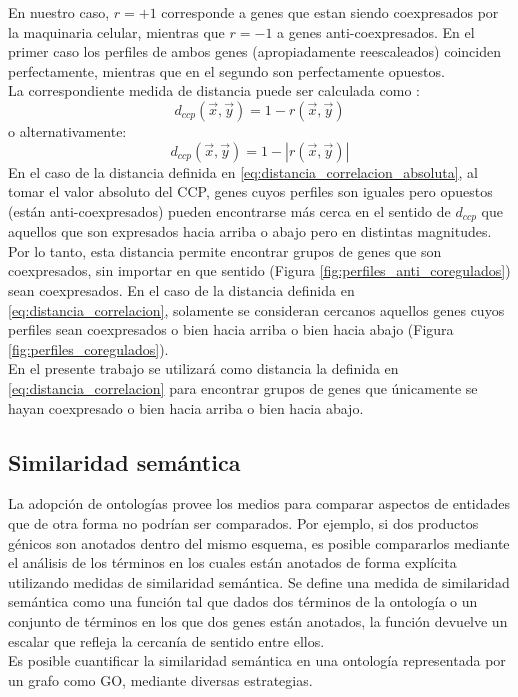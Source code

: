 En nuestro caso, $r=+1$ corresponde a genes que estan siendo coexpresados por la maquinaria celular, mientras que $r=-1$ a genes anti-coexpresados. En el primer caso los perfiles de ambos genes
(apropiadamente reescaleados) coinciden perfectamente, mientras que en el segundo son perfectamente opuestos.\\
La correspondiente medida de distancia puede ser calculada como \cite{Dhaeseleer2005}:
\begin{equation}
	d_{ccp}(\vec{x}, \vec{y}) = 1-r(\vec{x}, \vec{y})
	\label{eq:distancia_correlacion}
\end{equation}
o alternativamente:
\begin{equation}
	d_{ccp}(\vec{x}, \vec{y}) = 1-|r(\vec{x}, \vec{y})|
	\label{eq:distancia_correlacion_absoluta}
\end{equation}
En el caso de la distancia definida en \ref{eq:distancia_correlacion_absoluta}, al tomar el valor absoluto del CCP, genes cuyos perfiles son iguales pero opuestos (están anti-coexpresados) pueden encontrarse más cerca en el sentido de $d_{ccp}$ que aquellos que son expresados hacia arriba o abajo pero en distintas magnitudes. Por lo tanto, esta distancia permite encontrar grupos de genes que son coexpresados, sin importar en que sentido (Figura \ref{fig:perfiles_anti_coregulados}) sean coexpresados.
En el caso de la distancia definida en \ref{eq:distancia_correlacion}, solamente se consideran cercanos aquellos genes cuyos perfiles sean coexpresados o bien hacia arriba o bien hacia abajo (Figura \ref{fig:perfiles_coregulados}).\cite{Hennig2013, Kheng2010, Babu2004, Gan2007}\\
En el presente trabajo se utilizará como distancia la definida en \ref{eq:distancia_correlacion} para encontrar grupos de genes que únicamente se hayan coexpresado o bien hacia arriba o bien hacia abajo.\cite{Eisen1998}
\clearpage
\subsection{Similaridad semántica}
La adopción de ontologías provee los medios para comparar aspectos de entidades que de otra forma no podrían ser comparados. Por ejemplo, si dos productos génicos son anotados dentro del mismo esquema, es posible compararlos mediante el análisis de los términos en los cuales están anotados de forma explícita utilizando medidas de similaridad semántica. Se define una medida de similaridad semántica como una función tal que dados dos términos de la ontología o un conjunto de términos en los que dos genes están anotados, la función devuelve un escalar que refleja la cercanía de sentido entre ellos.\\
Es posible cuantificar la similaridad semántica en una ontología representada por un grafo como GO, mediante diversas estrategias.
